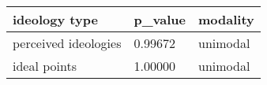 \begin{table}
\centering
\begin{tabular}[t]{lll}
\toprule
ideology type & p\_value & modality\\
\midrule
perceived ideologies & 0.99672 & unimodal\\
ideal points & 1.00000 & unimodal\\
\bottomrule
\end{tabular}
\end{table}
